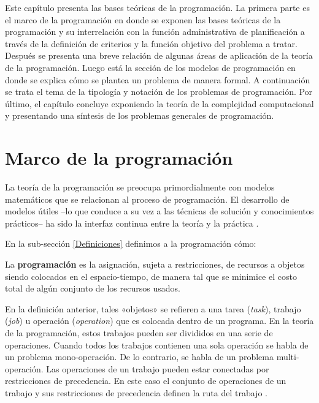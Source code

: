 \documentclass[spanish,draft,12pt,headsepline,footsepline,paper=letter]{scrreprt}
\renewenvironment{quotation}{\list{}{\leftmargin=0.25in}\item[]}{\endlist}
\begin{document}
Este capítulo presenta las bases teóricas de la programación. La primera parte es el marco de la programación en donde se exponen las bases teóricas de la programación y su interrelación con la función administrativa de planificación a través de la definición de criterios y la función objetivo del problema a tratar. Después se presenta una breve relación de algunas áreas de aplicación de la teoría de la programación. Luego está la sección de los modelos de programación en donde se explica cómo se plantea un problema de manera formal. A continuación se trata el tema de la tipología y notación de los problemas de programación. Por último, el capítulo concluye exponiendo la teoría de la complejidad computacional y presentando una síntesis de los problemas generales de programación.

\section{Marco de la programación}

La teoría de la programación se preocupa primordialmente con modelos matemáticos que se relacionan al proceso de programación. El desarrollo de modelos útiles –lo que conduce a su vez a las técnicas de solución y conocimientos prácticos– ha sido la interfaz continua entre la teoría y la práctica \citep[p.~3,~4]{Baker2009}. 

En la sub-sección \ref{Definiciones} definimos a la programación cómo:

\begin{quotation}
La \textbf{programación} es la asignación, sujeta a restricciones, de recursos a objetos siendo colocados en el espacio-tiempo, de manera tal que se minimice el costo total de algún conjunto de los recursos usados.
\end{quotation}

En la definición anterior, tales «objetos» se refieren a una tarea (\textit{task}), trabajo (\textit{job}) u operación (\textit{operation}) que es colocada dentro de un programa. En la teoría de la programación, estos trabajos pueden ser divididos en una serie de operaciones. Cuando todos los trabajos contienen una sola operación se habla de un problema mono-operación. De lo contrario, se habla de un problema multi-operación. Las operaciones de un trabajo pueden estar conectadas por restricciones de precedencia. En este caso el conjunto de operaciones de un trabajo y sus restricciones de precedencia definen la ruta del trabajo \citep[p.~5]{TKindt2002}.
\end{document}
